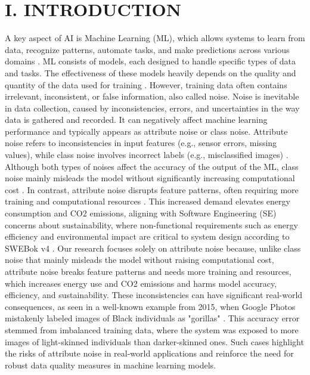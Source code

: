 \documentclass[conference]{IEEEtran}
\begin{document}
\section*{I. INTRODUCTION}
A key aspect of AI is Machine Learning (ML), which allows systems to learn from data, recognize patterns, automate tasks, and make predictions across various domains \cite{google_ai_ml}.
ML consists of models, each designed to handle specific types of data and tasks. The effectiveness of these models heavily depends on the quality and quantity of the data used for training \cite{wuzu}.
However, training data often contains irrelevant, inconsistent, or false information, also called noise.
\newline
\newline
Noise is inevitable in data collection, caused by inconsistencies, errors, and uncertainties in the way data is gathered and recorded. It can negatively affect machine learning performance and typically appears as attribute noise or class noise. Attribute noise refers to inconsistencies in input features (e.g., sensor errors, missing values), while class noise involves incorrect labels (e.g., misclassified images) \cite{dataheroes_noise}. 
\newline
\newline
Although both types of noises affect the accuracy of the output of the ML, class noise mainly misleads the model without significantly increasing computational cost \cite{wuzu}. In contrast, attribute noise disrupts feature patterns, often requiring more training and computational resources \cite{wuzu}. This increased demand elevates energy consumption and CO2 emissions, aligning with Software Engineering (SE) concerns about sustainability, where non-functional requirements such as energy efficiency and environmental impact are critical to system design according to SWEBok v4 \cite[p. 69]{sweb}.
\newline
\newline
Our research focuses solely on attribute noise because, unlike class noise that mainly misleads the model without raising computational cost, attribute noise breaks feature patterns and needs more training and resources, which increases energy use and CO2 emissions and harms model accuracy, efficiency, and sustainability. These inconsistencies can have significant real-world consequences, as seen in a well-known example from 2015, when Google Photos mistakenly labeled images of Black individuals as "gorillas" \cite{guardian2015}. This accuracy error stemmed from imbalanced training data, where the system was exposed to more images of light-skinned individuals than darker-skinned ones. Such cases highlight the risks of attribute noise in real-world applications and reinforce the need for robust data quality measures in machine learning models.
\end{document}
